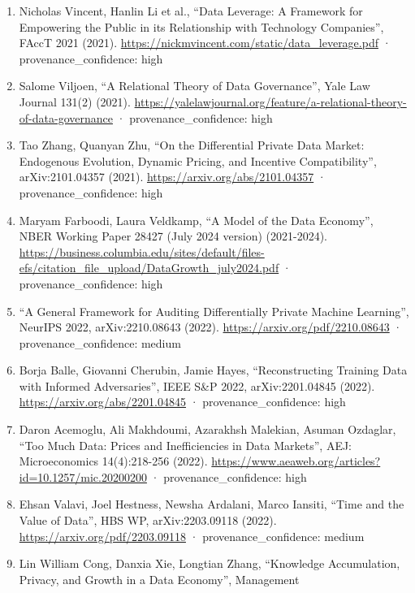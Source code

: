 \documentclass[
  11pt,
]{article}
\begin{document}
\begin{enumerate}
  Ignacio N. Cofone, ``Beyond Data Ownership'', 43 Cardozo Law Review
  (2021).
  \url{https://papers.ssrn.com/sol3/papers.cfm?abstract_id=3564480} ·
  provenance\_confidence: high
\item
  Nicholas Vincent, Hanlin Li et al., ``Data Leverage: A Framework for
  Empowering the Public in its Relationship with Technology Companies'',
  FAccT 2021 (2021).
  \url{https://nickmvincent.com/static/data_leverage.pdf} ·
  provenance\_confidence: high
\item
  Salome Viljoen, ``A Relational Theory of Data Governance'', Yale Law
  Journal 131(2) (2021).
  \url{https://yalelawjournal.org/feature/a-relational-theory-of-data-governance}
  · provenance\_confidence: high
\item
  Tao Zhang, Quanyan Zhu, ``On the Differential Private Data Market:
  Endogenous Evolution, Dynamic Pricing, and Incentive Compatibility'',
  arXiv:2101.04357 (2021). \url{https://arxiv.org/abs/2101.04357} ·
  provenance\_confidence: high
\item
  Maryam Farboodi, Laura Veldkamp, ``A Model of the Data Economy'', NBER
  Working Paper 28427 (July 2024 version) (2021-2024).
  \url{https://business.columbia.edu/sites/default/files-efs/citation_file_upload/DataGrowth_july2024.pdf}
  · provenance\_confidence: high
\item
  ``A General Framework for Auditing Differentially Private Machine
  Learning'', NeurIPS 2022, arXiv:2210.08643 (2022).
  \url{https://arxiv.org/pdf/2210.08643} · provenance\_confidence:
  medium
\item
  Borja Balle, Giovanni Cherubin, Jamie Hayes, ``Reconstructing Training
  Data with Informed Adversaries'', IEEE S\&P 2022, arXiv:2201.04845
  (2022). \url{https://arxiv.org/abs/2201.04845} ·
  provenance\_confidence: high
\item
  Daron Acemoglu, Ali Makhdoumi, Azarakhsh Malekian, Asuman Ozdaglar,
  ``Too Much Data: Prices and Inefficiencies in Data Markets'', AEJ:
  Microeconomics 14(4):218-256 (2022).
  \url{https://www.aeaweb.org/articles?id=10.1257/mic.20200200} ·
  provenance\_confidence: high
\item
  Ehsan Valavi, Joel Hestness, Newsha Ardalani, Marco Iansiti, ``Time
  and the Value of Data'', HBS WP, arXiv:2203.09118 (2022).
  \url{https://arxiv.org/pdf/2203.09118} · provenance\_confidence:
  medium
\item
  Lin William Cong, Danxia Xie, Longtian Zhang, ``Knowledge
  Accumulation, Privacy, and Growth in a Data Economy'', Management

\end{enumerate}
\end{document}
